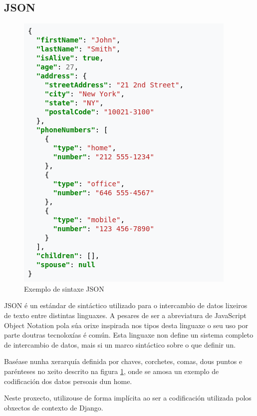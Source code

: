 \subsection{JSON}

\begin{figure}[h]
	\centering
	\includegraphics[scale=0.5,keepaspectratio=true]{./images/json.png}
	\caption{Exemplo de sintaxe JSON\cite{json_wiki}}
	\label{fig:json}
\end{figure}

JSON é un estándar de sintáctico utilizado para o intercambio de datos lixeiros de texto entre distintas linguaxes. A pesares de ser a abreviatura de JavaScript Object Notation pola súa orixe inspirada nos tipos desta linguaxe\cite{json} o seu uso por parte doutras tecnoloxías é común. Esta linguaxe non define un sistema completo de intercambio de datos, mais si un marco sintáctico sobre o que definir un.

Baséase nunha xerarquía definida por chaves, corchetes, comas, dous puntos e parénteses no xeito descrito na figura \ref{fig:json}, onde se amosa un exemplo de codificación dos datos persoais dun home.

Neste proxecto, utilizouse de forma implícita ao ser a codificación utilizada polos obxectos de contexto de Django.

